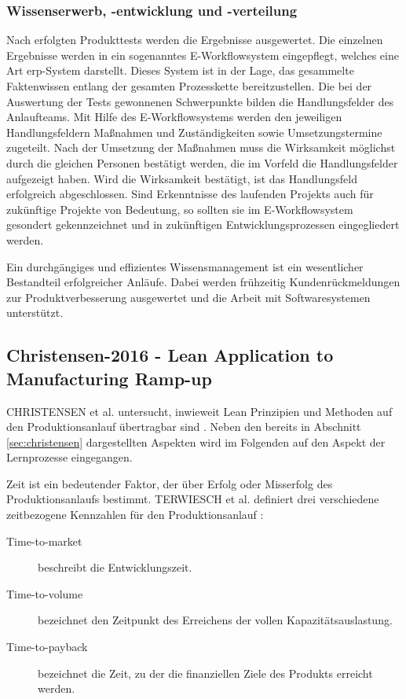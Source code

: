 \subsubsection*{Wissenserwerb, -entwicklung und -verteilung}
Nach erfolgten Produkttests werden die Ergebnisse ausgewertet. Die einzelnen Ergebnisse werden in ein sogenanntes E-Workflowsystem eingepflegt, welches eine Art \gls{erp}-System darstellt.
Dieses System ist in der Lage, das gesammelte Faktenwissen entlang der gesamten Prozesskette bereitzustellen. Die bei der Auswertung der Tests gewonnenen Schwerpunkte bilden die Handlungsfelder des Anlaufteams. Mit Hilfe des E-Workflowsystems werden den jeweiligen Handlungsfeldern Maßnahmen und Zuständigkeiten sowie Umsetzungstermine zugeteilt. 
Nach der Umsetzung der Maßnahmen muss die Wirksamkeit möglichst durch die gleichen Personen bestätigt werden, die im Vorfeld die Handlungsfelder aufgezeigt haben. Wird die Wirksamkeit bestätigt, ist das Handlungsfeld erfolgreich abgeschlossen. 
Sind Erkenntnisse des laufenden Projekts auch für zukünftige Projekte von Bedeutung, so sollten sie im E-Workflowsystem gesondert gekennzeichnet und in zukünftigen Entwicklungsprozessen eingegliedert werden. 



Ein durchgängiges und effizientes Wissensmanagement ist ein wesentlicher Bestandteil erfolgreicher Anläufe. Dabei werden frühzeitig Kundenrückmeldungen zur Produktverbesserung ausgewertet und die Arbeit mit Softwaresystemen unterstützt. 

\subsection*{Christensen-2016 - Lean Application to Manufacturing Ramp-up}
CHRISTENSEN et al. untersucht, inwieweit Lean Prinzipien und Methoden auf den Produktionsanlauf übertragbar sind \autocite{Christensen2016}. Neben den bereits in Abschnitt \ref{sec:christensen} dargestellten Aspekten wird im Folgenden auf den Aspekt der Lernprozesse eingegangen. 


Zeit ist ein bedeutender Faktor, der über Erfolg oder Misserfolg des Produktionsanlaufs bestimmt. TERWIESCH et al. definiert drei verschiedene zeitbezogene Kennzahlen für den Produktionsanlauf \autocite{Terwiesch2001}: 
\begin{description}
 \item[Time-to-market] beschreibt die Entwicklungszeit.
 \item[Time-to-volume] bezeichnet den Zeitpunkt des Erreichens der vollen Kapazitätsauslastung.
 \item[Time-to-payback] bezeichnet die Zeit, zu der die finanziellen Ziele des Produkts erreicht werden. 
\end{description}


